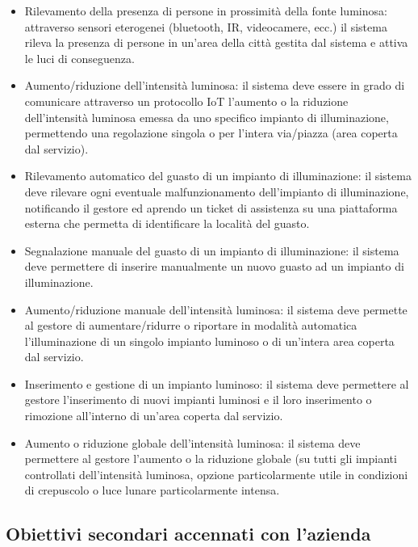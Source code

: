 \begin{itemize}
    \item Rilevamento della presenza di persone in prossimità della fonte luminosa: attraverso sensori eterogenei (bluetooth, IR, videocamere, ecc.) il sistema rileva la presenza di persone in un’area della città gestita dal sistema e attiva le luci di conseguenza.
    \item Aumento/riduzione dell’intensità luminosa: il sistema deve essere in grado di comunicare attraverso un protocollo IoT l’aumento o la riduzione dell’intensità luminosa emessa da uno specifico impianto di illuminazione, permettendo una regolazione singola o per l’intera via/piazza (area coperta dal servizio).
    \item Rilevamento automatico del guasto di un impianto di illuminazione: il sistema deve rilevare ogni eventuale malfunzionamento dell’impianto di illuminazione, notificando il gestore ed aprendo un ticket di assistenza su una piattaforma esterna che permetta di identificare la località del guasto.
    \item Segnalazione manuale del guasto di un impianto di illuminazione: il sistema deve permettere di inserire manualmente un nuovo guasto ad un impianto di illuminazione.
    \item Aumento/riduzione manuale dell’intensità luminosa: il sistema deve permette al gestore di aumentare/ridurre o riportare in modalità automatica l’illuminazione di un singolo impianto luminoso o di un’intera area coperta dal servizio.
    \item Inserimento e gestione di un impianto luminoso: il sistema deve permettere al gestore
    l’inserimento di nuovi impianti luminosi e il loro inserimento o rimozione all’interno di un’area coperta dal servizio.
    \item Aumento o riduzione globale dell’intensità luminosa: il sistema deve permettere al gestore l’aumento o la riduzione globale (su tutti gli impianti controllati dell’intensità luminosa, opzione particolarmente utile in condizioni di crepuscolo o luce lunare particolarmente intensa.
    
\end{itemize}

\subsection{Obiettivi secondari accennati con l'azienda}


